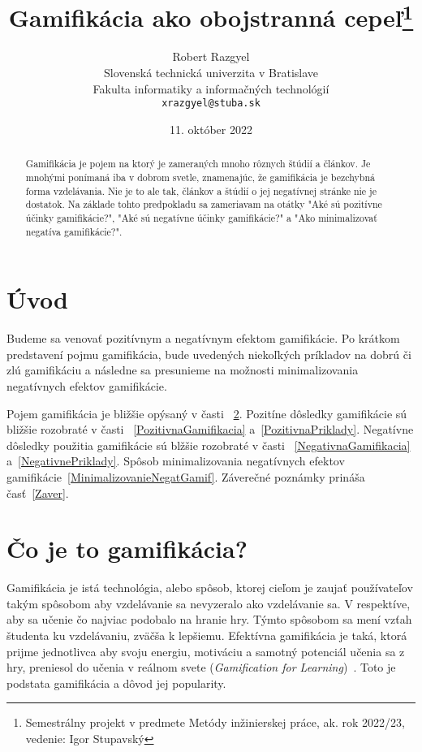 \documentclass[10pt,oneside,slovak,a4paper]{article}
\title{Gamifikácia ako obojstranná cepeľ\thanks{Semestrálny projekt v predmete Metódy inžinierskej práce, ak. rok 2022/23, vedenie: Igor Stupavský}}
\author{Robert Razgyel\\[2pt]
	{\small Slovenská technická univerzita v Bratislave}\\
	{\small Fakulta informatiky a informačných technológií}\\
	{\small \texttt{xrazgyel@stuba.sk}}
	}
\date{\small 11. október 2022} %
\begin{document}
\maketitle

\begin{abstract}
Gamifikácia je pojem na ktorý je zameraných mnoho rôznych štúdií a článkov. Je mnohými ponímaná iba v dobrom svetle, znamenajúc, že gamifikácia je bezchybná forma vzdelávania. Nie je to ale tak, článkov a štúdií o jej negatívnej stránke nie je dostatok. Na základe tohto predpokladu sa zameriavam na otátky "Aké sú pozitívne účinky gamifikácie?", "Aké sú negatívne účinky gamifikácie?" a "Ako minimalizovať negatíva gamifikácie?". 
\end{abstract}



\section{Úvod}

Budeme sa venovať pozitívnym a negatívnym efektom gamifikácie. Po krátkom predstavení pojmu gamifikácia, bude uvedených niekoľkých príkladov na dobrú či zlú gamifikáciu a následne sa presunieme na možnosti minimalizovania negatívnych efektov gamifikácie.

Pojem gamifikácia je bližšie opýsaný v časti ~\ref{CoJeGamifikacia}.
Pozitíne dôsledky gamifikácie sú bližšie rozobraté v časti ~\ref{PozitivnaGamifikacia} a~\ref{PozitivnaPriklady}.
Negatívne dôsledky použitia gamifikácie sú blžšie rozobraté v časti ~\ref{NegativnaGamifikacia} a~\ref{NegativnePriklady}.
Spôsob minimalizovania negatívnych efektov gamifikácie~\ref{MinimalizovanieNegatGamif}.
Záverečné poznámky prináša časť~\ref{Zaver}.

\section{Čo je to gamifikácia?} \label{CoJeGamifikacia}

Gamifikácia je istá technológia, alebo spôsob, ktorej cieľom je zaujať používateľov takým spôsobom aby vzdelávanie sa nevyzeralo ako vzdelávanie sa. V respektíve, aby sa učenie čo najviac podobalo na hranie hry. Týmto spôsobom sa mení vzťah študenta ku vzdelávaniu, zväčša k lepšiemu. Efektívna gamifikácia je taká, ktorá prijme jednotlivca aby svoju energiu, motiváciu a samotný potenciál učenia sa z hry, preniesol do učenia v reálnom svete (\emph{Gamification for Learning})~\cite{10.1007/978-3-319-97934-2_9}. Toto je podstata gamifikácia a dôvod jej popularity.
\end{document}
